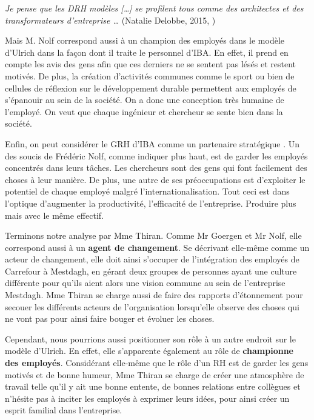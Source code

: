 \og{} \textit{Je pense que les DRH modèles [\ldots] se profilent tous comme 
des architectes et des transformateurs d’entreprise \ldots} \fg{} (Natalie Delobbe, 2015, \cite{tableronde}) \newline

Mais M. Nolf correspond aussi à un \og champion des employés \fg{} dans le modèle d'Ulrich dans la façon dont il traite le personnel d'IBA. En effet, il prend en compte les avis des gens afin que ces derniers ne se sentent pas lésés et restent motivés. De plus, la création d'activités communes comme le sport ou bien de cellules de réflexion sur le développement durable permettent aux employés de s'épanouir au sein de la société. On a donc une conception très humaine de l'employé. On veut que chaque ingénieur et chercheur se sente bien dans la société. \newline

Enfin, on peut considérer le GRH d'IBA comme un \og partenaire stratégique \fg{}. Un des soucis de Frédéric Nolf, comme indiquer plus haut, est de garder les employés concentrés dans leurs tâches. Les chercheurs sont des gens qui font facilement des choses à leur manière. De plus, une autre de ses préoccupations est d'exploiter le potentiel de chaque employé malgré l'internationalisation. Tout ceci est dans l'optique d'augmenter la productivité, l'efficacité de l'entreprise. Produire plus mais avec le même effectif. 

Terminons notre analyse par Mme Thiran. Comme Mr Goergen et Mr Nolf, elle correspond aussi à un \textbf{agent de changement}. Se décrivant elle-même comme un acteur de changement, elle doit ainsi s’occuper de l’intégration des employés de Carrefour à Mestdagh, en gérant deux groupes de personnes ayant une culture différente pour qu’ils aient alors une vision commune au sein de l'entreprise Mestdagh. Mme Thiran se charge aussi de faire des rapports d’étonnement pour secouer les différents acteurs de l’organisation lorsqu’elle observe des choses qui ne vont pas pour ainsi faire bouger et évoluer les choses.\newline

Cependant, nous pourrions aussi positionner son rôle à un autre endroit sur le modèle d’Ulrich. En effet, elle s’apparente également au rôle de \textbf{championne des employés}. Considérant elle-même que le rôle d’un RH est de garder les gens motivés et de bonne humeur, Mme Thiran se charge de créer une atmosphère de travail telle qu’il y ait une bonne entente, de bonnes relations entre collègues et n’hésite pas à inciter les employés à exprimer leurs idées, pour ainsi créer un esprit familial dans l’entreprise. 

